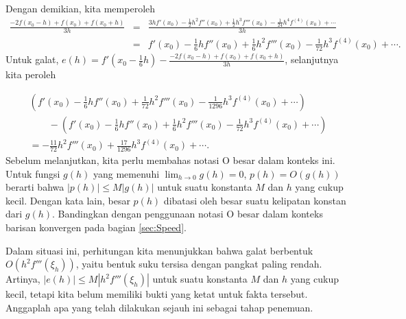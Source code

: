 \noindent Dengan demikian, kita memperoleh 
\begin{eqnarray*}
\frac{-2f(x_{0}-h)+f(x_{0})+f(x_{0}+h)}{3h} & = & \frac{3hf'(x_{0})-\frac{1}{2}h^{2}f''(x_{0})+\frac{1}{2}h^{3}f'''(x_{0})-\frac{1}{24}h^{4}f^{(4)}(x_{0})+\cdots}{3h}\\
 & = & f'(x_{0})-\frac{1}{6}hf''(x_{0})+\frac{1}{6}h^{2}f'''(x_{0})-\frac{1}{72}h^{3}f^{(4)}(x_{0})+\cdots.
\end{eqnarray*}
Untuk galat, $e(h)=f'\left(x_{0}-\frac{1}{6}h\right)-\frac{-2f(x_{0}-h)+f(x_{0})+f(x_{0}+h)}{3h}$,
selanjutnya kita peroleh

\[
\begin{gathered}\left(f'(x_{0})-\frac{1}{6}hf''(x_{0})+\frac{1}{72}h^{2}f'''(x_{0})-\frac{1}{1296}h^{3}f^{(4)}(x_{0})+\cdots\right)\\
\qquad-\left(f'(x_{0})-\frac{1}{6}hf''(x_{0})+\frac{1}{6}h^{2}f'''(x_{0})-\frac{1}{72}h^{3}f^{(4)}(x_{0})+\cdots\right)\\
=-\frac{11}{72}h^{2}f'''(x_{0})+\frac{17}{1296}h^{3}f^{(4)}(x_{0})+\cdots.\qquad\qquad\qquad\qquad\qquad
\end{gathered}
\]
Sebelum melanjutkan, kita perlu membahas notasi O besar
dalam konteks ini.  Untuk fungsi $g(h)$
yang memenuhi ${\displaystyle \lim_{h\to0}g(h)=0}$, $p(h)=O(g(h))$
berarti bahwa $|p(h)|\leq M|g(h)|$ untuk suatu konstanta $M$ dan
$h$ yang cukup kecil. Dengan kata lain, besar $p(h)$ dibatasi oleh
besar suatu kelipatan konstan dari $g(h)$. Bandingkan dengan penggunaan
notasi O besar dalam konteks barisan konvergen pada bagian \ref{sec:Speed}. 

Dalam situasi ini, perhitungan kita menunjukkan bahwa galat berbentuk
$O(h^{2}f'''(\xi_{h}))$, yaitu bentuk suku tersisa dengan pangkat
paling rendah. Artinya, $|e(h)|\leq M|h^{2}f'''(\xi_{h})|$ untuk
suatu konstanta $M$ dan $h$ yang cukup kecil, tetapi kita belum
memiliki bukti yang ketat untuk fakta tersebut. Anggaplah apa yang
telah dilakukan sejauh ini sebagai tahap penemuan.

